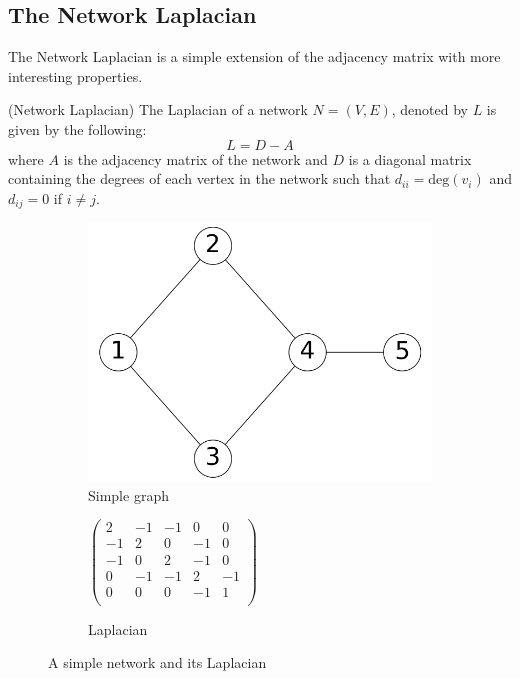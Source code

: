 \subsection{The Network Laplacian}
The Network Laplacian is a simple extension of the adjacency matrix with more interesting properties.

\begin{definition}{(Network Laplacian)}
    The Laplacian of a network $N = (V, E)$, denoted by $L$ is given by the following:
    $$ L = D - A $$
    where $A$ is the adjacency matrix of the network and $D$ is a diagonal matrix containing the degrees of each vertex in the network such that $d_{ii} = \text{deg}(v_i)$ and $d_{ij} = 0$ if $i \not= j$.
\end{definition}

\begin{figure}
    \begin{center}
        \begin{subfigure}[b]{0.45\textwidth}
            \includegraphics[width=\textwidth]{img/simple_example}
            \caption{Simple graph}
            \label{fig:simple_network_2}
        \end{subfigure}
        \begin{subfigure}[b]{0.45\textwidth}
            \begin{center}
            $
            \begin{pmatrix}
                 2 & -1 & -1 &  0 &  0 \\
                -1 &  2 &  0 & -1 &  0 \\
                -1 &  0 &  2 & -1 &  0 \\
                 0 & -1 & -1 &  2 & -1 \\
                 0 &  0 &  0 & -1 &  1 \\
            \end{pmatrix}
            $
            \end{center}
            \caption{Laplacian}
            \label{fig:simple_network_laplacian}
        \end{subfigure}
    \end{center}
    \caption{A simple network and its Laplacian}
    \label{fig:simple_network_and_laplacian}
\end{figure}


